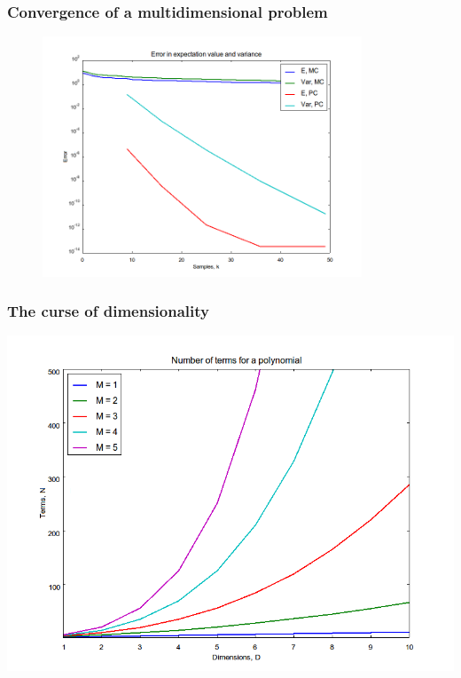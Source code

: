 \documentclass{beamer}
\begin{document}
 
\begin{frame}
 \frametitle{Convergence of a multidimensional problem}
\begin{figure}
    \includegraphics[width=0.85\textwidth]{MC_convergence_2D.png}
  \end{figure}

 \end{frame}
 
 
 
 
 
 
 

\begin{frame}
  \frametitle{The curse of dimensionality}
  \includegraphics[height = 0.85\textheight]{dimensionality.png}

\end{frame}
\end{document}
